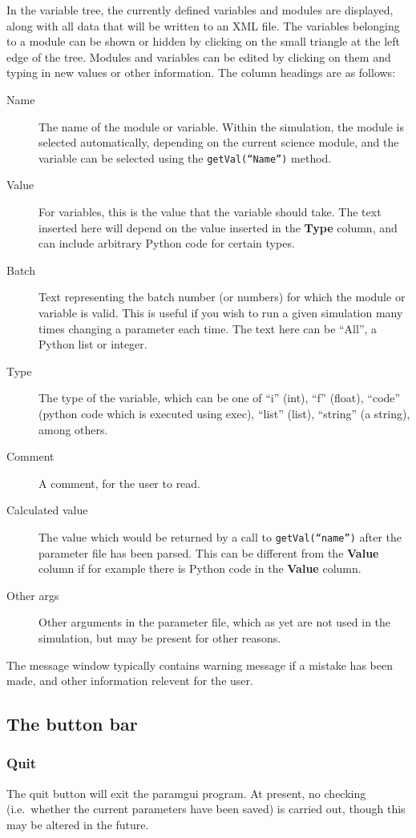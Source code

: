 \documentclass{article}
\begin{document}
In the variable tree, the currently
defined variables and modules are displayed, along with all data that
will be written to an XML file.  The variables belonging to a module
can be shown or hidden by clicking on the small triangle at the left
edge of the tree.  Modules and variables can be edited by clicking on
them and typing in new values or other information.  The column
headings are as follows:
\begin{description}
\item[Name] The name of the module or variable.  Within the
  simulation, the module is selected automatically, depending on the
  current science module, and the variable can be selected using the
  \texttt{getVal(``Name'')} method.
\item[Value] For variables, this is the value that the variable should
  take.  The text inserted here will depend on the value inserted in
  the {\bf Type} column, and can include arbitrary Python code for
  certain types.
\item[Batch] Text representing the batch number (or numbers) for which
  the module or variable is valid.  This is useful if you wish to run
  a given simulation many times changing a parameter each time.  The
  text here can be ``All'', a Python list or integer.  
\item[Type] The type of the variable, which can be one of ``i'' (int),
  ``f'' (float), ``code'' (python code which is executed using exec),
  ``list'' (list), ``string'' (a string), among others.
\item[Comment] A comment, for the user to read.
\item[Calculated value] The value which would be returned by a call to
  \texttt{getVal(``name'')} after the parameter file has been parsed.
  This can be different from the {\bf Value} column if for example
  there is Python code in the {\bf Value} column.
\item[Other args] Other arguments in the parameter file, which as yet
  are not used in the simulation, but may be present for other reasons.
\end{description}

The message window typically contains
warning message if a mistake has been made, and other information
relevent for the user.

\subsection{The button bar}
\subsubsection{Quit}
The quit button will exit the paramgui program.  At present, no
checking (i.e.\ whether the current parameters have been saved) is
carried out, though this may be altered in the future.
\end{document}

